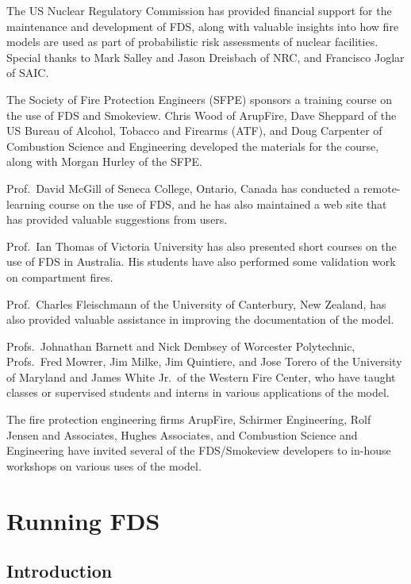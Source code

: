 \documentclass[11pt]{book}
\begin{document}
The US Nuclear Regulatory Commission has provided financial support for the maintenance and development of FDS,
along with valuable insights into how fire models are used as part of probabilistic risk assessments of nuclear
facilities. Special thanks to Mark Salley and Jason Dreisbach of NRC, and Francisco Joglar of SAIC.

The Society of Fire Protection Engineers (SFPE) sponsors a training course on the use of FDS and Smokeview.
Chris Wood of ArupFire, Dave Sheppard of the US Bureau of Alcohol, Tobacco and Firearms (ATF), and
Doug Carpenter of Combustion Science and Engineering developed the materials for the course, along with
Morgan Hurley of the SFPE.

Prof.~David McGill of Seneca College, Ontario, Canada has conducted a remote-learning course
on the use of FDS, and he has also maintained a web site that has provided valuable suggestions from users.

Prof.~Ian Thomas of Victoria University has also presented short courses on the use of FDS in Australia.
His students have also performed some validation work on compartment fires.

Prof.~Charles Fleischmann of the University of Canterbury, New Zealand, has also provided valuable assistance
in improving the documentation of the model.

Profs.~Johnathan Barnett and Nick Dembsey of Worcester Polytechnic, Profs.~Fred Mowrer, Jim Milke, Jim Quintiere,
and Jose Torero of the University of Maryland and James White Jr.~of the Western Fire Center, who have taught
classes or supervised students and interns in various applications of the model.

The fire protection engineering firms ArupFire, Schirmer Engineering, Rolf Jensen and Associates, Hughes Associates,
and Combustion Science and Engineering have invited several of the FDS/Smokeview developers to in-house workshops
on various uses of the model.



\tableofcontents

\mainmatter



\part{Running FDS}


\chapter{Introduction}
\end{document}

